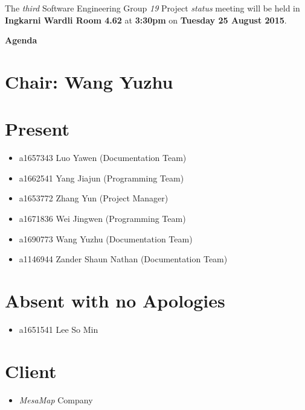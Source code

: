 \documentclass[a4paper] {article}
\begin{document}
	
	\vspace*{-50pt}
	
	\noindent The \emph{third} Software Engineering Group \emph{19} Project \emph{status} meeting will
	be held in \textbf{Ingkarni Wardli Room 4.62} at \textbf {3:30pm} on \textbf{Tuesday 25 August 2015}.
	
	
	\begin{center}
		\huge \textbf {Agenda}
	\end{center}
	

	\section*{Chair: Wang Yuzhu}
	
	\vspace*{10pt}
	
	\section{Present}
	\begin{itemize}
		\item a1657343 Luo Yawen (Documentation Team)
		\item a1662541 Yang Jiajun (Programming Team)
		\item a1653772 Zhang Yun (Project Manager)
		\item a1671836 Wei Jingwen (Programming Team)
		\item a1690773 Wang Yuzhu (Documentation Team)
		\item a1146944 Zander Shaun Nathan (Documentation Team)
	\end{itemize}
	
	\section{Absent with no Apologies}
	\begin{itemize}
		\item a1651541 Lee So Min
	\end{itemize}  
	
        \section{Client}
        \begin{itemize}
            \item \emph{MesaMap} Company
        \end{itemize} 
	
\end{document}
